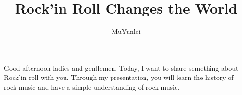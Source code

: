\documentclass{article}
\title{Rock'in Roll Changes the World}
\author{MuYunlei}
\begin{document}
\maketitle
Good afternoon ladies and gentlemen. Today, I want to share something about Rock'in roll with you. Through my presentation, you will learn the history of rock music and have a simple understanding of rock music. 
\end{document}
